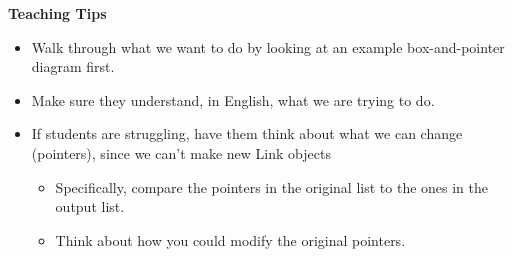 \begin{blocksection}
\begin{guide}
    \textbf{Teaching Tips}
    \begin{itemize}
       \item Walk through what we want to do by looking at an example box-and-pointer diagram first. 
       \item Make sure they understand, in English, what we are trying to do.
       \item If students are struggling, have them think about what we can change (pointers), since we can't make new Link objects
       \begin{itemize}
           \item Specifically, compare the pointers in the original list to the ones in the output list. 
           \item Think about how you could modify the original pointers.
       \end{itemize}
    \end{itemize}
 \end{guide}

\end{blocksection}
